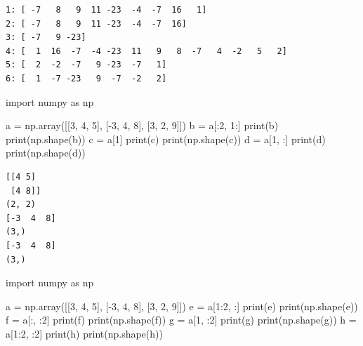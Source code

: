 \documentclass[
  letterpaper,
  DIV=11,
  numbers=noendperiod]{scrreprt}
\newenvironment{Shaded}{\begin{snugshade}}{\end{snugshade}}
\newcommand{\BuiltInTok}[1]{\textcolor[rgb]{0.00,0.23,0.31}{#1}}
\newcommand{\DecValTok}[1]{\textcolor[rgb]{0.68,0.00,0.00}{#1}}
\newcommand{\ImportTok}[1]{\textcolor[rgb]{0.00,0.46,0.62}{#1}}
\newcommand{\NormalTok}[1]{\textcolor[rgb]{0.00,0.23,0.31}{#1}}
\newcommand{\OperatorTok}[1]{\textcolor[rgb]{0.37,0.37,0.37}{#1}}
\begin{document}
\begin{verbatim}
1: [ -7   8   9  11 -23  -4  -7  16   1]
2: [ -7   8   9  11 -23  -4  -7  16]
3: [ -7   9 -23]
4: [  1  16  -7  -4 -23  11   9   8  -7   4  -2   5   2]
5: [  2  -2  -7   9 -23  -7   1]
6: [  1  -7 -23   9  -7  -2   2]
\end{verbatim}

\begin{Shaded}
\begin{Highlighting}[]
\ImportTok{import}\NormalTok{ numpy }\ImportTok{as}\NormalTok{ np}

\NormalTok{a }\OperatorTok{=}\NormalTok{ np.array([[}\DecValTok{3}\NormalTok{, }\DecValTok{4}\NormalTok{, }\DecValTok{5}\NormalTok{], [}\OperatorTok{{-}}\DecValTok{3}\NormalTok{, }\DecValTok{4}\NormalTok{, }\DecValTok{8}\NormalTok{], [}\DecValTok{3}\NormalTok{, }\DecValTok{2}\NormalTok{, }\DecValTok{9}\NormalTok{]])}
\NormalTok{b }\OperatorTok{=}\NormalTok{ a[:}\DecValTok{2}\NormalTok{, }\DecValTok{1}\NormalTok{:]}
\BuiltInTok{print}\NormalTok{(b)}
\BuiltInTok{print}\NormalTok{(np.shape(b))}
\NormalTok{c }\OperatorTok{=}\NormalTok{ a[}\DecValTok{1}\NormalTok{]}
\BuiltInTok{print}\NormalTok{(c)}
\BuiltInTok{print}\NormalTok{(np.shape(c))}
\NormalTok{d }\OperatorTok{=}\NormalTok{ a[}\DecValTok{1}\NormalTok{, :]}
\BuiltInTok{print}\NormalTok{(d)}
\BuiltInTok{print}\NormalTok{(np.shape(d))}
\end{Highlighting}
\end{Shaded}

\begin{verbatim}
[[4 5]
 [4 8]]
(2, 2)
[-3  4  8]
(3,)
[-3  4  8]
(3,)
\end{verbatim}

\begin{Shaded}
\begin{Highlighting}[]
\ImportTok{import}\NormalTok{ numpy }\ImportTok{as}\NormalTok{ np}

\NormalTok{a }\OperatorTok{=}\NormalTok{ np.array([[}\DecValTok{3}\NormalTok{, }\DecValTok{4}\NormalTok{, }\DecValTok{5}\NormalTok{], [}\OperatorTok{{-}}\DecValTok{3}\NormalTok{, }\DecValTok{4}\NormalTok{, }\DecValTok{8}\NormalTok{], [}\DecValTok{3}\NormalTok{, }\DecValTok{2}\NormalTok{, }\DecValTok{9}\NormalTok{]])}
\NormalTok{e }\OperatorTok{=}\NormalTok{ a[}\DecValTok{1}\NormalTok{:}\DecValTok{2}\NormalTok{, :]}
\BuiltInTok{print}\NormalTok{(e)}
\BuiltInTok{print}\NormalTok{(np.shape(e))}
\NormalTok{f }\OperatorTok{=}\NormalTok{ a[:, :}\DecValTok{2}\NormalTok{]}
\BuiltInTok{print}\NormalTok{(f)}
\BuiltInTok{print}\NormalTok{(np.shape(f))}
\NormalTok{g }\OperatorTok{=}\NormalTok{ a[}\DecValTok{1}\NormalTok{, :}\DecValTok{2}\NormalTok{]}
\BuiltInTok{print}\NormalTok{(g)}
\BuiltInTok{print}\NormalTok{(np.shape(g))}
\NormalTok{h }\OperatorTok{=}\NormalTok{ a[}\DecValTok{1}\NormalTok{:}\DecValTok{2}\NormalTok{, :}\DecValTok{2}\NormalTok{]}
\BuiltInTok{print}\NormalTok{(h)}
\BuiltInTok{print}\NormalTok{(np.shape(h))}
\end{Highlighting}
\end{Shaded}
\end{document}
